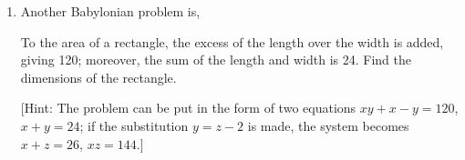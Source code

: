 \documentclass[12pt]{article}
\theoremstyle{homework}
\begin{document}
\begin{enumerate}
\textbf{Answer:} Substituting our given values of $x + y = 10$ and $xy = 16$ into the the identity $(x-y)^2 = (x+y)^2 - 4xy$ we get the following,
\begin{equation*}
  (x-y)^2 = (10)^2 - 4(16) = 1,40 - 1,4 = 36
\end{equation*}
Therefore we know that $x - y = 6$. then the Babylonians would have solved the following system, 
\begin{equation*}
  x - y = 6, 
\end{equation*}
\begin{equation*}
  xy = 16
\end{equation*}
by first calculating $\frac{6}{2} = 3$ then applying a formula, where
\begin{equation*}
  x = z + 3
\end{equation*}
\begin{equation*}
  y = z - 3
\end{equation*}
We can quickly solve for $z$ however the texts states that the Babylonians had a formula where $z = \sqrt{(\frac{a}{2})^2 - b}$. Using $x + y = 10$
we get that (Note: they could have also seen this),
\begin{align*}
  (z + 3) + (z - 3) = 10\\
  2z = 10\\
  z = 5
\end{align*}
Finally substituting $z = 5$ and gives us $x = 8$ and $y = 2$.
\vspace{.5in}



\item Another Babylonian problem is,
\begin{center}
To the area of a rectangle, the excess of the length over the width is added, giving 120; moreover, the sum of the length and width is 24. Find the dimensions of the rectangle.
\end{center}
[Hint: The problem can be put in the form of two equations $xy+x-y=120$, $x+y=24$; if the substitution $y=z-2$ is made, the system becomes $x+z=26$, $xz=144$.]\\


\end{enumerate}
\end{document}
